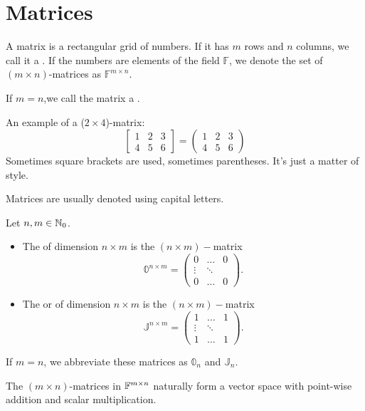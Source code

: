 \section{Matrices}
\begin{definition}
A matrix is a rectangular grid of numbers. If it has $m$ rows and $n$ columns, we call it a .
If the numbers are elements of the field $\mathbb{F}$, we denote the set of $(m\times n)$-matrices as $\mathbb{F}^{m\times n}$.

If $m=n$,we call the matrix a .
\end{definition}
\begin{example}
An example of a ($2\times 4$)-matrix:
\[ \begin{bmatrix}
1 &2 &3\\4 &5&6
\end{bmatrix} = \begin{pmatrix}
1 &2 &3\\4 &5&6
\end{pmatrix} \]
Sometimes square brackets are used, sometimes parentheses. It's just a matter of style.
\end{example}
Matrices are usually denoted using capital letters.

\begin{definition}
Let $n,m\in\mathbb{N}_0$.
\begin{itemize}
\item The  of dimension $n\times m$ is the $(n\times m)-$matrix
\[ \mathbb{0}^{n\times m} = \begin{pmatrix}
0 & \hdots & 0 \\
\vdots & \ddots & \\
0 & \hdots & 0
\end{pmatrix}. \]
\item The  or  of dimension $n\times m$ is the $(n\times m)-$matrix
\[ \mathbb{J}^{n\times m} = \begin{pmatrix}
1 & \hdots & 1 \\
\vdots & \ddots & \\
1 & \hdots & 1
\end{pmatrix}. \]
\end{itemize}
If $m=n$, we abbreviate these matrices as $\mathbb{0}_n$ and $\mathbb{J}_n$.
\end{definition}

\begin{lemma}
The $(m\times n)$-matrices in $\mathbb{F}^{m\times n}$ naturally form a vector space with point-wise addition and scalar multiplication. 
\end{lemma}

